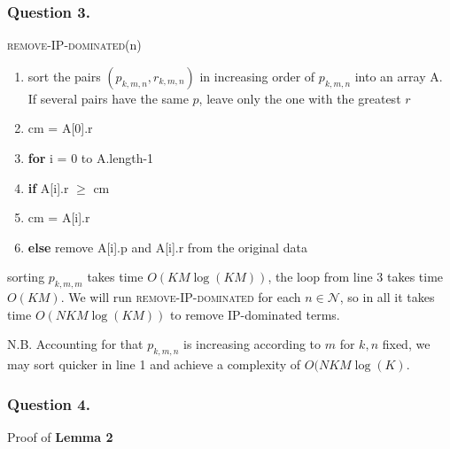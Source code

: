 \documentclass[10pt, oneside]{report}
\begin{document}
\subsubsection{Question 3.}
\noindent\textsc{remove-IP-dominated}(n)
\begin{enumerate}[1\ ]
\setlength{\topsep}{0.05ex}
\setlength{\itemsep}{0.05ex}
\item sort the pairs $(p_{k,m,n}, r_{k,m,n})$ in increasing order of $p_{k,m,n}$ into an array A. If several pairs have the same $p$, leave only the one with the greatest $r$
\item cm = A[0].r
\item \textbf{for} i = 0 to A.length-1
\item \qquad \textbf{if} A[i].r $\ge$ cm
\item \qquad \qquad cm = A[i].r
\item \qquad \textbf{else} remove A[i].p and A[i].r from the original data
\end{enumerate}


sorting $p_{k,m,m}$ takes time $O(KM\log(KM))$, the loop from line 3 takes time $O(KM)$. We will run \textsc{remove-IP-dominated} for each $n\in\mathcal{N}$, so in all it takes time $O(NKM\log(KM))$ to remove IP-dominated terms.

\noindent\textsc{N.B.} Accounting for that $p_{k,m,n}$ is increasing according to $m$ for $k,n$ fixed, we may sort quicker in line 1 and achieve a complexity of $O(NKM\log(K)$.

\subsubsection{Question 4.}
Proof of \textbf{Lemma 2}
\end{document}

